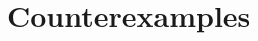 \documentclass{amsart}
\renewcommand{\AA}{\mathscr A}
\begin{document}
\section*{Counterexamples}



\end{document}

